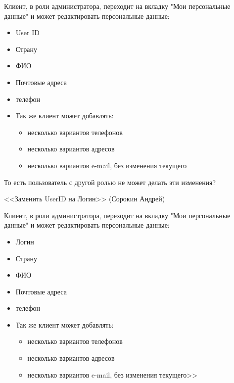{

\begin{wiki}
Клиент, в роли администратора, переходит на вкладку "Мои персональные данные" и может редактировать персональные данные:
\begin{itemize}
\item User ID
\item Страну
\item ФИО
\item Почтовые адреса
\item телефон
\item Так же клиент может добавлять:
	\begin{itemize}
	\item несколько вариантов телефонов
	\item несколько вариантов адресов
	\item несколько вариантов e-mail, без изменения текущего
	\end{itemize}
\end{itemize}
\end{wiki}

\begin{hybris}
То есть пользователь с другой ролью не может делать эти изменения?
\end{hybris}

\begin{tn}
<<Заменить UserID на Логин>> (Сорокин Андрей)
\end{tn}


\begin{itogo}
Клиент, в роли администратора, переходит на вкладку "Мои персональные данные" и может редактировать персональные данные:
\begin{itemize}
	\item Логин
	\item Страну
	\item ФИО
	\item Почтовые адреса
	\item телефон
	\item Так же клиент может добавлять:
		\begin{itemize}
		\item несколько вариантов телефонов
		\item несколько вариантов адресов
		\item несколько вариантов e-mail, без изменения текущего>>
		\end{itemize}
\end{itemize}
\end{itogo}




}

